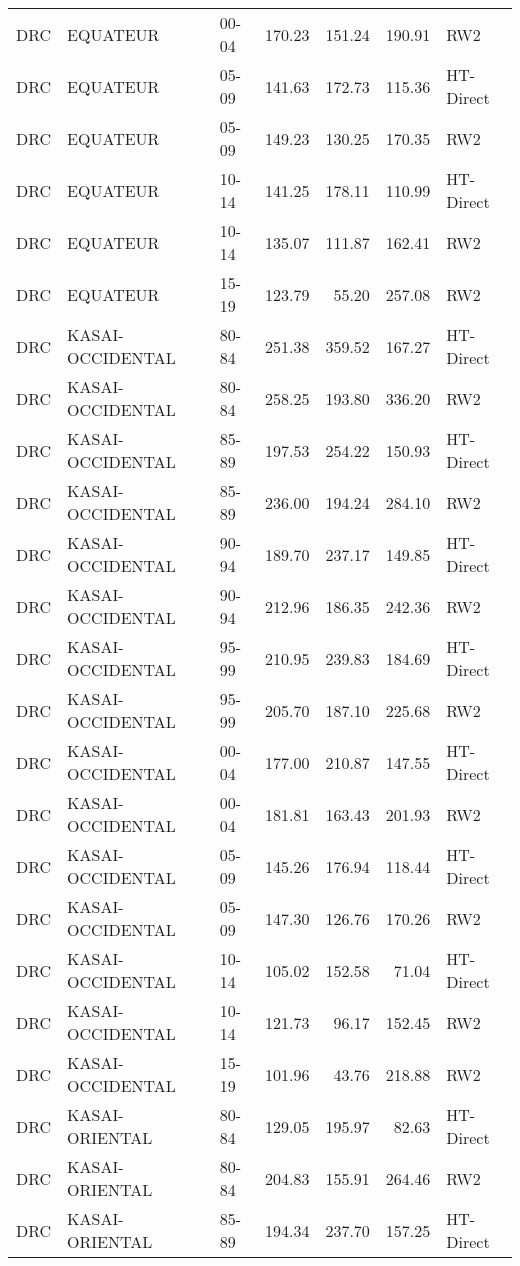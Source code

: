\begin{longtable}{lllrrrl}
  DRC & EQUATEUR & 00-04 & 170.23 & 151.24 & 190.91 & RW2 \\ 
  DRC & EQUATEUR & 05-09 & 141.63 & 172.73 & 115.36 & HT-Direct \\ 
  DRC & EQUATEUR & 05-09 & 149.23 & 130.25 & 170.35 & RW2 \\ 
  DRC & EQUATEUR & 10-14 & 141.25 & 178.11 & 110.99 & HT-Direct \\ 
  DRC & EQUATEUR & 10-14 & 135.07 & 111.87 & 162.41 & RW2 \\ 
  DRC & EQUATEUR & 15-19 & 123.79 & 55.20 & 257.08 & RW2 \\ 
  DRC & KASAI-OCCIDENTAL & 80-84 & 251.38 & 359.52 & 167.27 & HT-Direct \\ 
  DRC & KASAI-OCCIDENTAL & 80-84 & 258.25 & 193.80 & 336.20 & RW2 \\ 
  DRC & KASAI-OCCIDENTAL & 85-89 & 197.53 & 254.22 & 150.93 & HT-Direct \\ 
  DRC & KASAI-OCCIDENTAL & 85-89 & 236.00 & 194.24 & 284.10 & RW2 \\ 
  DRC & KASAI-OCCIDENTAL & 90-94 & 189.70 & 237.17 & 149.85 & HT-Direct \\ 
  DRC & KASAI-OCCIDENTAL & 90-94 & 212.96 & 186.35 & 242.36 & RW2 \\ 
  DRC & KASAI-OCCIDENTAL & 95-99 & 210.95 & 239.83 & 184.69 & HT-Direct \\ 
  DRC & KASAI-OCCIDENTAL & 95-99 & 205.70 & 187.10 & 225.68 & RW2 \\ 
  DRC & KASAI-OCCIDENTAL & 00-04 & 177.00 & 210.87 & 147.55 & HT-Direct \\ 
  DRC & KASAI-OCCIDENTAL & 00-04 & 181.81 & 163.43 & 201.93 & RW2 \\ 
  DRC & KASAI-OCCIDENTAL & 05-09 & 145.26 & 176.94 & 118.44 & HT-Direct \\ 
  DRC & KASAI-OCCIDENTAL & 05-09 & 147.30 & 126.76 & 170.26 & RW2 \\ 
  DRC & KASAI-OCCIDENTAL & 10-14 & 105.02 & 152.58 & 71.04 & HT-Direct \\ 
  DRC & KASAI-OCCIDENTAL & 10-14 & 121.73 & 96.17 & 152.45 & RW2 \\ 
  DRC & KASAI-OCCIDENTAL & 15-19 & 101.96 & 43.76 & 218.88 & RW2 \\ 
  DRC & KASAI-ORIENTAL & 80-84 & 129.05 & 195.97 & 82.63 & HT-Direct \\ 
  DRC & KASAI-ORIENTAL & 80-84 & 204.83 & 155.91 & 264.46 & RW2 \\ 
  DRC & KASAI-ORIENTAL & 85-89 & 194.34 & 237.70 & 157.25 & HT-Direct \\ 

\end{longtable}
